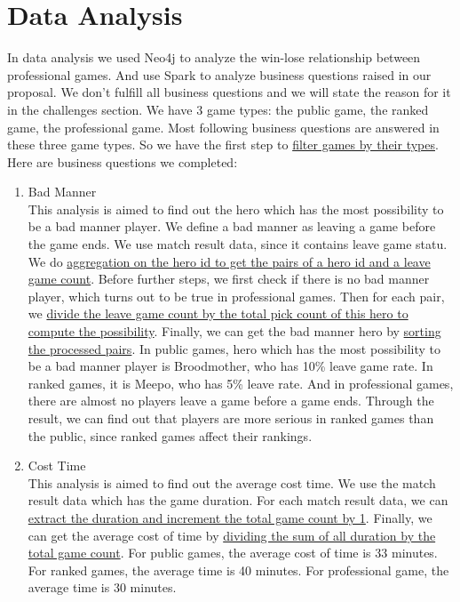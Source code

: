 \documentclass{article}
\begin{document}
\section{Data Analysis}
In data analysis we used Neo4j to analyze the win-lose relationship between professional games. And use Spark to analyze business questions raised in our proposal. We don't fulfill all business questions and we will state the reason for it in the challenges section. We have 3 game types: the public game, the ranked game, the professional game. Most following business questions are answered in these three game types. So we have the first step to \href{https://github.com/Vopaaz/big-data-psg-lgd/blob/master/src/main/scala/Spark/SparkMongoHelper.scala#L31-L47}{filter games by their types}. Here are business questions we completed:
\begin{enumerate}
    \item Bad Manner \\
    This analysis is aimed to find out the hero which has the most possibility to be a bad manner player. We define a bad manner as leaving a game before the game ends. We use match result data, since it contains leave game statu. We do \href{https://github.com/Vopaaz/big-data-psg-lgd/blob/master/src/main/scala/BadManner.scala#L46-L47}{aggregation on the hero id to get the pairs of a hero id and a leave game count}. Before further steps, we first check if there is no bad manner player, which turns out to be true in professional games. Then for each pair, we \href{https://github.com/Vopaaz/big-data-psg-lgd/blob/master/src/main/scala/BadManner.scala#L48}{divide the leave game count by the total pick count of this hero to compute the possibility}. Finally, we can get the bad manner hero by \href{https://github.com/Vopaaz/big-data-psg-lgd/blob/master/src/main/scala/BadManner.scala#L50}{sorting the processed pairs}. In public games, hero which has the most possibility to be a bad manner player is Broodmother, who has 10\% leave game rate. In ranked games, it is Meepo, who has 5\% leave rate. And in professional games, there are almost no players leave a game before a game ends. Through the result, we can find out that players are more serious in ranked games than the public, since ranked games affect their rankings.
    \item Cost Time \\
    This analysis is aimed to find out the average cost time. We use the match result data which has the game duration. For each match result data, we can \href{https://github.com/Vopaaz/big-data-psg-lgd/blob/master/src/main/scala/CostTime.scala#L30}{extract the duration and increment the total game count by 1}. Finally, we can get the average cost of time by \href{https://github.com/Vopaaz/big-data-psg-lgd/blob/master/src/main/scala/CostTime.scala#L31}{dividing the sum of all duration by the total game count}. For public games, the average cost of time is 33 minutes. For ranked games, the average time is 40 minutes. For professional game, the average time is 30 minutes.

\end{enumerate}
\end{document}
